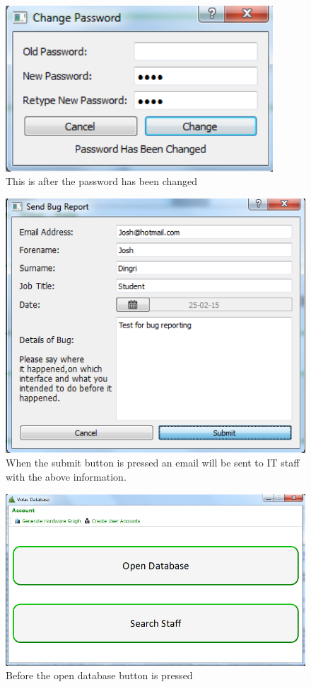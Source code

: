 \begin{figure}[H]
    \includegraphics[width=100mm,scale=1]{./Testing/Images/ChangedPassword.png}
    \caption{This is after the password has been changed} \label{fig:ChangedPassword}
\end{figure}

\begin{figure}[H]
    \includegraphics[width=\textwidth]{./Testing/Images/SubmitBugTest.png}
    \caption{When the submit button is pressed an email will be sent to IT staff with the above information.} \label{fig:SubmitBugTest}
\end{figure}

\begin{figure}[H]
    \includegraphics[width=\textwidth]{./Testing/Images/AdminInterface.png}
    \caption{Before the open database button is pressed} \label{fig:OpenDatabaseInterfaceBF}
\end{figure}


